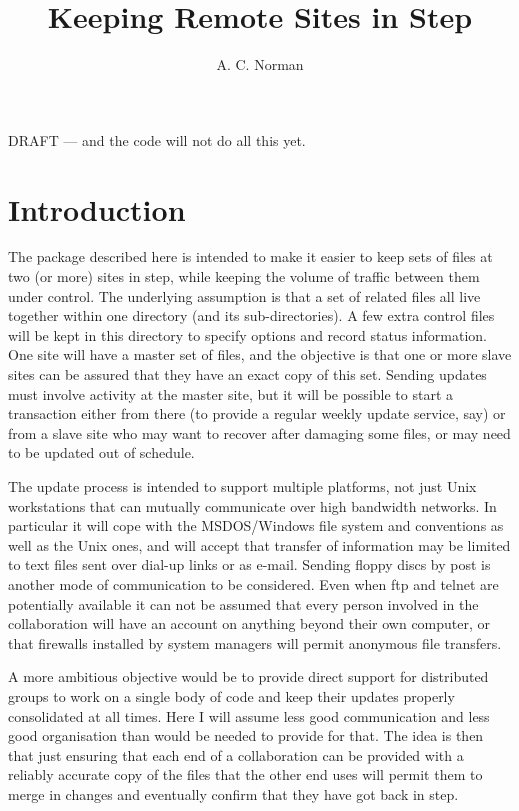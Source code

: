 \title{Keeping Remote Sites in Step}
\author{A. C. Norman}


\begin{center}
DRAFT --- and the code will not do all this yet.
\end{center}
\vspace{0.6in}

\section{Introduction}
The package described here is intended to make it easier to keep
sets of files at two (or more) sites in step, while keeping the volume
of traffic between them under control.  The underlying assumption
is that a set of related files all live together within one
directory (and its sub-directories).  A few extra control files will
be kept in this directory to specify options and record status information.
One site will have a master set of files, and the objective is that
one or more slave sites can be assured that they have an exact copy of
this set. Sending updates must involve activity at the master site, but
it will be possible to start a transaction either from there (to provide
a regular weekly update service, say) or from a slave site who may want to
recover after damaging some files, or may need to be updated out of
schedule.

The update process is intended to support multiple platforms, not just
Unix workstations that can mutually communicate over high bandwidth
networks.  In particular it will cope with the MSDOS/Windows file system
and conventions as well as the Unix ones, and will accept that transfer
of information may be limited to text files sent over dial-up links or
as e-mail.  Sending floppy discs by post is another mode of communication
to be considered.  Even when ftp and telnet are potentially available it can
not be assumed that every person involved in the collaboration will have
an account on anything beyond their own computer, or that firewalls
installed by system managers will permit anonymous file transfers.

A more ambitious objective would be to provide direct support for
distributed groups to work on a single body of code and keep their updates
properly consolidated at all times.  Here I will assume less good
communication and less good organisation than would be needed to
provide for that.  The idea is then that just ensuring that each end
of a collaboration can be provided with a reliably accurate copy of
the files that the other end uses will permit them to merge in changes
and eventually confirm that they have got back in step.

